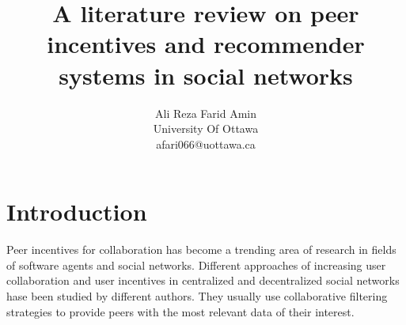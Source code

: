 \documentclass [12pt]{article} \usepackage{multicol}
\begin{document}
		 \hypersetup{
    colorlinks,
    citecolor=black,
    filecolor=black,
    linkcolor=black,
    urlcolor=black }

         
			\hyphenchar{} \pagestyle{headings}
		 \setcounter{page}{1}

	\let\Oldsection\section
\renewcommand{\section}{\FloatBarrier\Oldsection}

	\let\Oldsubsection\subsection
\renewcommand{\subsection}{\FloatBarrier\Oldsubsection}

	\let\Oldsubsubsection\subsubsection
\renewcommand{\subsubsection}{\FloatBarrier\Oldsubsubsection}

\title{A literature review on peer incentives and recommender
systems in social networks} \author{Ali Reza Farid Amin\\
University Of Ottawa\\ afari066@uottawa.ca} 
\maketitle
\tableofcontents

\section{Introduction}
		Peer incentives for collaboration has become a trending area of
research in fields of software agents and social networks. Different
approaches of increasing user collaboration and user incentives in
centralized and decentralized social networks hase been studied by
different authors. They usually use collaborative filtering
strategies to provide peers with the most relevant data of their
interest.
\end{document}
